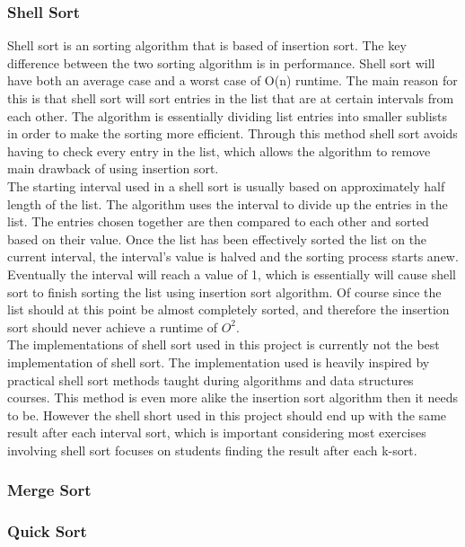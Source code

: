 \subsubsection{Shell Sort}
Shell sort is an sorting algorithm that is based of insertion sort. The key difference between the two sorting algorithm is in performance. Shell sort will have both an average case and a worst case of O(n) runtime. The main reason for this is that shell sort will sort entries in the list that are at certain intervals from each other. The algorithm is essentially dividing list entries into smaller sublists in order to make the sorting more efficient. Through this method shell sort avoids having to check every entry in the list, which allows the algorithm to remove main drawback of using insertion sort. 
\\The starting interval used in a shell sort is usually based on approximately half length of the list. The algorithm uses the interval to divide up the entries in the list. The entries chosen together are then compared to each other and sorted based on their value. Once the list has been effectively sorted the list on the current interval, the interval's value is halved and the sorting process starts anew. Eventually the interval will reach a value of 1, which is essentially will cause shell sort to finish sorting the list using insertion sort algorithm. Of course since the list should at this point be almost completely sorted, and therefore the insertion sort should never achieve a runtime of $O^2$.
\\The implementations of shell sort used in this project is currently not the best implementation of shell sort. The implementation used is heavily inspired by practical shell sort methods taught during algorithms and data structures courses. This method is even more alike the insertion sort algorithm then it needs to be. However the shell short used in this project should end up with the same result after each interval sort, which is important considering most exercises involving shell sort focuses on students finding the result after each k-sort.  
\subsubsection{Merge Sort}

\subsubsection{Quick Sort}
